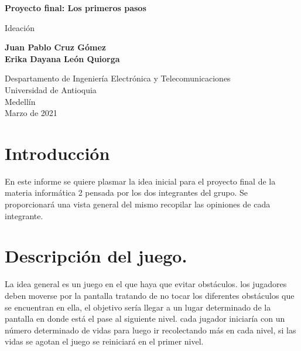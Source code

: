 \documentclass{article}
\begin{document}
\begin{titlepage}
    \begin{center}
        \vspace*{1cm}
            
        \Huge
        \textbf{Proyecto final: Los primeros pasos}
            
        \vspace{0.5cm}
        \LARGE
        Ideación
            
        \vspace{1.5cm}
            
        \textbf{Juan Pablo Cruz Gómez\\
                Erika Dayana León Quiorga}
            
        \vfill
            
        \vspace{0.8cm}
            
        \Large
        Despartamento de Ingeniería Electrónica y Telecomunicaciones\\
        Universidad de Antioquia\\
        Medellín\\
        Marzo de 2021
            
    \end{center}
\end{titlepage}

\tableofcontents
\newpage
\section{Introducción}\label{intro}
En este informe se quiere plasmar la idea inicial para el proyecto final de la materia informática 2 pensada por los dos integrantes del grupo. Se proporcionará una vista general del mismo recopilar las opiniones de cada integrante.

\section{Descripción del juego.} \label{contenido}

  La idea general es un juego en el que haya que evitar obstáculos. los jugadores deben moverse por la pantalla tratando de no tocar los diferentes obstáculos que se encuentran en ella, el objetivo sería llegar a un lugar determinado de la pantalla en donde está el pase al siguiente nivel. cada jugador iniciaría con un número determinado de vidas para luego ir recolectando más en cada nivel, si las vidas se agotan el juego se reiniciará en el primer nivel.
\end{document}
